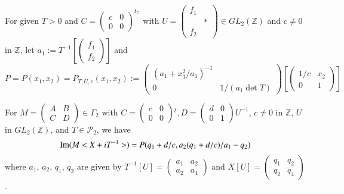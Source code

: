 \begin{defi*}
For given $T>0$ and $C=\left(\begin{smallmatrix} c & 0\\ 0 & 0
\end{smallmatrix}\right)^{t_{U}}$ with $U=\left(\begin{smallmatrix}
  f_{1} & \\ & \ast\\ f_{2} & \end{smallmatrix}\right)\in
GL_{2}(\mathbb{Z})$ and $c\neq 0$ in $\mathbb{Z}$, let
$a_{1}:=T^{-1}\left[\left(\begin{smallmatrix} f_{1}\\ f_{2}
  \end{smallmatrix}\right)\right]$ and
{\fontsize{10}{12}\selectfont
$$
P = P(x_{1},x_{2})=P_{T,U,c} (x_{1},x_{2}):=
\begin{pmatrix}
(a_{1}+x^{2}_{1}/a_{1})^{-1} & \\
0 & 1/(a_{1}\det T)
\end{pmatrix}
\left[
\begin{pmatrix}
1/c & x_{2}\\
0 & 1
\end{pmatrix}
\right]
$$}
\end{defi*}

\setcounter{sublemma}{15}
\begin{sublemma}\label{c1:lem-1.4.16}
For $M=\left(\begin{smallmatrix} A & B\\ C & D
\end{smallmatrix}\right)\in \Gamma_{2}$ with
$C=\left(\begin{smallmatrix} c & 0\\ 0 & 0
\end{smallmatrix}\right){}^{t},D=\left(\begin{smallmatrix} d & 0\\ 0 &
  1 \end{smallmatrix}\right)U^{-1}$, $c\neq 0$ in $\mathbb{Z}$, $U$ in
$GL_{2}(\mathbb{Z})$, and $T\in\mathscr{P}_{2}$, we have
$$
\operatorname{Im}(M<X+iT^{-1}>) = P(q_{1}+d/c,a_{2}(q_{1}+d/c)/a_{1}-q_{2})
$$
where $a_{1}$, $a_{2}$, $q_{1}$, $q_{2}$ are given by
$T^{-1}[U]=\left(\begin{smallmatrix} a_{1} & a_{2}\\ a_{2} & a_{4}
\end{smallmatrix}\right)$ and $X[U]=\left(\begin{smallmatrix}
q_{1} & q_{2}\\ q_{2} & q_{4}\end{smallmatrix}\right)$. 
\end{sublemma}

